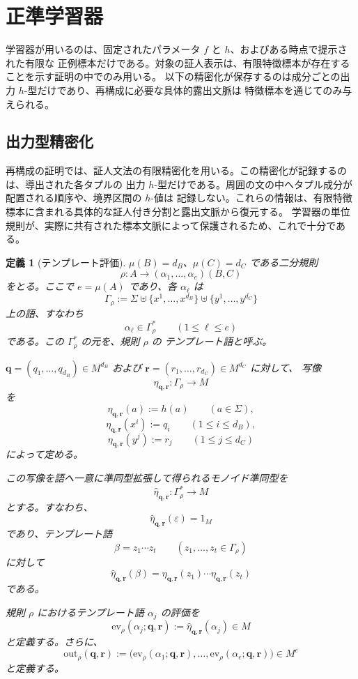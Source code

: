 \documentclass[11pt,a4paper]{ltjsarticle}
\newtheorem{definition}[theorem]{定義}
\theoremstyle{remark}
\newcommand{\out}{\mathrm{out}}
\newcommand{\ev}{\mathrm{ev}}
\newcommand{\eps}{\varepsilon}
\begin{document}
\section{正準学習器}
\label{sec:learner}

学習器が用いるのは、固定されたパラメータ \(f\) と \(h\)、およびある時点で提示された有限な
正例標本だけである。対象の証人表示は、有限特徴標本が存在することを示す証明の中でのみ用いる。
以下の精密化が保存するのは成分ごとの出力 \(h\)-型だけであり、再構成に必要な具体的露出文脈は
特徴標本を通じてのみ与えられる。

\subsection{出力型精密化}
\label{sec:refinement}

再構成の証明では、証人文法の有限精密化を用いる。この精密化が記録するのは、導出された各タプルの
出力 \(h\)-型だけである。周囲の文の中へタプル成分が配置される順序や、境界区間の \(h\)-値は
記録しない。これらの情報は、有限特徴標本に含まれる具体的な証人付き分割と露出文脈から復元する。
学習器の単位規則が、実際に共有された標本文脈によって保護されるため、これで十分である。

\begin{definition}[テンプレート評価]
\label{def:output-map}
\(\mu(B)=d_B\)、\(\mu(C)=d_C\) である二分規則
\[
  \rho\colon
  A\to(\alpha_1,\ldots,\alpha_e)(B,C)
\]
をとる。ここで \(e=\mu(A)\) であり、各 \(\alpha_\ell\) は
\[
  \Gamma_\rho
  :=
  \Sigma
  \uplus
  \{x^1,\ldots,x^{d_B}\}
  \uplus
  \{y^1,\ldots,y^{d_C}\}
\]
上の語、すなわち
\[
  \alpha_\ell\in\Gamma_\rho^*
  \qquad (1\le \ell\le e)
\]
である。この \(\Gamma_\rho^*\) の元を、規則 \(\rho\) の
\emph{テンプレート語}と呼ぶ。

\(\mathbf q=(q_1,\ldots,q_{d_B})\in M^{d_B}\) および
\(\mathbf r=(r_1,\ldots,r_{d_C})\in M^{d_C}\) に対して、
写像
\[
  \eta_{\mathbf q,\mathbf r}\colon\Gamma_\rho\to M
\]
を
\[
  \eta_{\mathbf q,\mathbf r}(a):=h(a)
  \qquad (a\in\Sigma),
\]
\[
  \eta_{\mathbf q,\mathbf r}(x^i):=q_i
  \qquad (1\le i\le d_B),
\]
\[
  \eta_{\mathbf q,\mathbf r}(y^j):=r_j
  \qquad (1\le j\le d_C)
\]
によって定める。

この写像を語へ一意に準同型拡張して得られるモノイド準同型を
\[
  \widehat{\eta}_{\mathbf q,\mathbf r}
  \colon
  \Gamma_\rho^*\to M
\]
とする。すなわち、
\[
  \widehat{\eta}_{\mathbf q,\mathbf r}(\eps)=1_M
\]
であり、テンプレート語
\[
  \beta=z_1\cdots z_t
  \qquad (z_1,\ldots,z_t\in\Gamma_\rho)
\]
に対して
\[
  \widehat{\eta}_{\mathbf q,\mathbf r}(\beta)
  =
  \eta_{\mathbf q,\mathbf r}(z_1)
  \cdots
  \eta_{\mathbf q,\mathbf r}(z_t)
\]
である。

規則 \(\rho\) におけるテンプレート語 \(\alpha_j\) の評価を
\[
  \ev_\rho(\alpha_j;\mathbf q,\mathbf r)
  :=
  \widehat{\eta}_{\mathbf q,\mathbf r}(\alpha_j)
  \in M
\]
と定義する。さらに、
\[
  \out_\rho(\mathbf q,\mathbf r)
  :=
  \bigl(
    \ev_\rho(\alpha_1;\mathbf q,\mathbf r),
    \ldots,
    \ev_\rho(\alpha_e;\mathbf q,\mathbf r)
  \bigr)
  \in M^e
\]
と定義する。
\end{definition}
\end{document}
